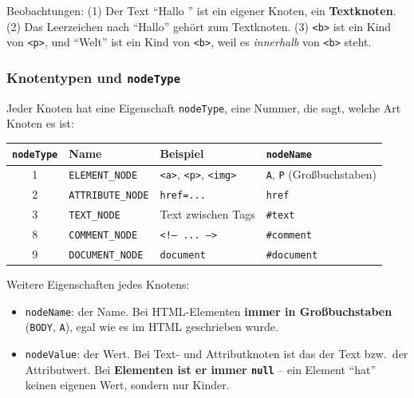 \documentclass[a4paper,11pt]{article}
\begin{document}
Beobachtungen: (1) Der Text "`Hallo "' ist ein eigener Knoten, ein \textbf{Textknoten}. (2) Das Leerzeichen nach
"`Hallo"' gehört zum Textknoten. (3) \texttt{<b>} ist ein Kind von \texttt{<p>}, und "`Welt"' ist ein Kind von
\texttt{<b>}, weil es \emph{innerhalb} von \texttt{<b>} steht.

\subsubsection*{Knotentypen und \texttt{nodeType}}

Jeder Knoten hat eine Eigenschaft \texttt{nodeType}, eine Nummer, die sagt, welche Art Knoten es ist:

\begin{center}
\begin{tabular}{@{}clll@{}}
\toprule
\texttt{nodeType} & Name & Beispiel & \texttt{nodeName}\\
\midrule
1 & \texttt{ELEMENT\_NODE}   & \texttt{<a>}, \texttt{<p>}, \texttt{<img>} & \texttt{\textquotedbl{}A\textquotedbl{}}, \texttt{\textquotedbl{}P\textquotedbl{}} (Großbuchstaben)\\
2 & \texttt{ATTRIBUTE\_NODE} & \texttt{href=\textquotedbl{}...\textquotedbl{}}                       & \texttt{\textquotedbl{}href\textquotedbl{}}\\
3 & \texttt{TEXT\_NODE}      & Text zwischen Tags                         & \texttt{\textquotedbl{}\#text\textquotedbl{}}\\
8 & \texttt{COMMENT\_NODE}   & \texttt{<!-- ... -->}                      & \texttt{\textquotedbl{}\#comment\textquotedbl{}}\\
9 & \texttt{DOCUMENT\_NODE}  & \texttt{document}                          & \texttt{\textquotedbl{}\#document\textquotedbl{}}\\
\bottomrule
\end{tabular}
\end{center}

Weitere Eigenschaften jedes Knotens:
\begin{itemize}[nosep]
\item \texttt{nodeName}: der Name. Bei HTML-Elementen \textbf{immer in Großbuchstaben} (\texttt{\textquotedbl{}BODY\textquotedbl{}}, \texttt{\textquotedbl{}A\textquotedbl{}}),
      egal wie es im HTML geschrieben wurde.
\item \texttt{nodeValue}: der Wert. Bei Text- und Attributknoten ist das der Text bzw.\ der Attributwert.
      Bei \textbf{Elementen ist er immer \texttt{null}} -- ein Element "`hat"' keinen eigenen Wert, sondern nur Kinder.
\end{itemize}
\end{document}
